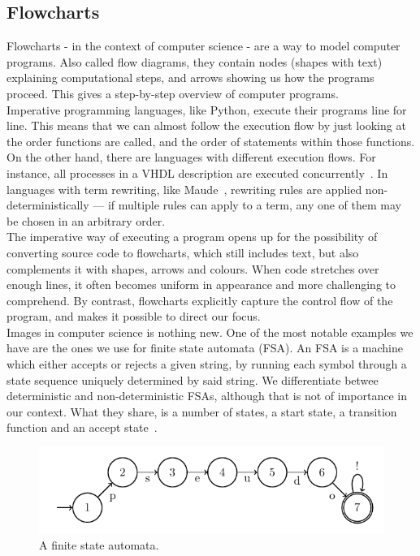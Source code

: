 \subsection{Flowcharts}

Flowcharts - in the context of computer science - are a way to model computer programs. Also called flow diagrams, they contain nodes (shapes with text) explaining computational steps, and arrows showing us how the programs proceed. This gives a step-by-step overview of computer programs. \\

Imperative programming languages, like Python, execute their programs line for line. This means that we can almost follow the execution flow by just looking at the order functions are called, and the order of statements within those functions. \\

On the other hand, there are languages with different execution flows. For instance, all processes in a VHDL description are executed concurrently~\cite{vhdl}. In languages with term rewriting, like Maude~\cite{maude}, rewriting rules are applied non-deterministically --- if multiple rules can apply to a term, any one of them may be chosen in an arbitrary order. \\

The imperative way of executing a program opens up for the possibility of converting source code to flowcharts, which still includes text, but also complements it with shapes, arrows and colours. When code stretches over enough lines, it often becomes uniform in appearance and more challenging to comprehend. By contrast, flowcharts explicitly capture the control flow of the program, and makes it possible to direct our focus. \\

Images in computer science is nothing new. One of the most notable examples we have are the ones we use for finite state automata (FSA). An FSA is a machine which either accepts or rejects a given string, by running each symbol through a state sequence uniquely determined by said string. We differentiate betwee deterministic and non-deterministic FSAs, although that is not of importance in our context. What they share, is a number of states, a start state, a transition function and an accept state~\cite{introToAutomataTheory}. \\

\begin{figure}[ht]
    \centering
    \includegraphics[scale=1.1]{assets/chapter2/Automata.pdf}
    \caption{A finite state automata.}
    \label{An example finite state automata.}
\end{figure}

